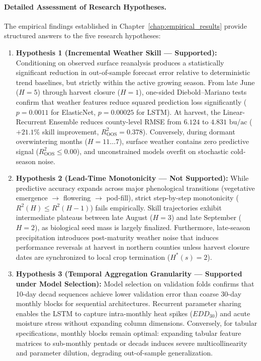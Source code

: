 \paragraph{Detailed Assessment of Research Hypotheses.}
The empirical findings established in Chapter~\ref{chap:empirical_results} provide structured answers to the five research hypotheses:

\begin{enumerate}
    \item \textbf{Hypothesis 1 (Incremental Weather Skill --- Supported):} Conditioning on observed surface reanalysis produces a statistically significant reduction in out-of-sample forecast error relative to deterministic trend baselines, but strictly within the active growing season. From late June ($H=5$) through harvest closure ($H=1$), one-sided Diebold--Mariano tests confirm that weather features reduce squared prediction loss significantly ($p=0.0011$ for ElasticNet, $p=0.00025$ for LSTM). At harvest, the Linear-Recurrent Ensemble reduces county-level RMSE from $6.124$ to $4.831\text{ bu/ac}$ ($+21.1\%$ skill improvement, $R^2_{\text{OOS}} = 0.378$). Conversely, during dormant overwintering months ($H=11 \dots 7$), surface weather contains zero predictive signal ($R^2_{\text{OOS}} \le 0.00$), and unconstrained models overfit on stochastic cold-season noise.
    
    \item \textbf{Hypothesis 2 (Lead-Time Monotonicity --- Not Supported):} While predictive accuracy expands across major phenological transitions (vegetative emergence $\to$ flowering $\to$ pod-fill), strict step-by-step monotonicity ($R^2(H) \le R^2(H-1)$) fails empirically. Skill trajectories exhibit intermediate plateaus between late August ($H=3$) and late September ($H=2$), as biological seed mass is largely finalized. Furthermore, late-season precipitation introduces post-maturity weather noise that induces performance reversals at harvest in northern counties unless harvest closure dates are synchronized to local crop termination ($H^*(s)=2$).
    
    \item \textbf{Hypothesis 3 (Temporal Aggregation Granularity --- Supported under Model Selection):} Model selection on validation folds confirms that 10-day decad sequences achieve lower validation error than coarse 30-day monthly blocks for sequential architectures. Recurrent parameter sharing enables the LSTM to capture intra-monthly heat spikes ($EDD_{30}$) and acute moisture stress without expanding column dimensions. Conversely, for tabular specifications, monthly blocks remain optimal: expanding tabular feature matrices to sub-monthly pentads or decads induces severe multicollinearity and parameter dilution, degrading out-of-sample generalization.
    

\end{enumerate}
